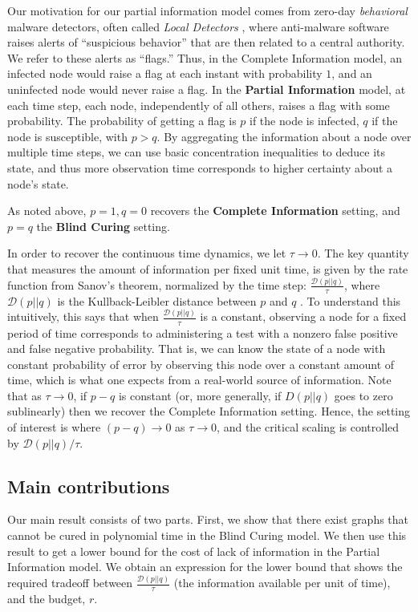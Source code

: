 Our motivation for our partial information model comes from zero-day {\em behavioral} malware detectors, often called {\em Local Detectors} \cite{bose2008,gregoire2008}, where anti-malware software raises alerts of ``suspicious behavior'' that are then related to a central authority. We refer to these alerts as ``flags.'' Thus, in the Complete Information model, an infected node would raise a flag at each instant with probability $1$, and an uninfected node would never raise a flag. In the \textbf{Partial Information} model, at each time step, each node, independently of all others, raises a flag with some probability. The probability of getting a flag is $p$ if the node is infected, $q$ if the node is susceptible, with $p>q$. By aggregating the information about a node over multiple time steps, we can use basic concentration inequalities to deduce its state, and thus more observation time corresponds to higher certainty about a node's state.

As noted above, $p=1, q=0$ recovers the \textbf{Complete Information} setting, and $p=q$ the \textbf{Blind Curing} setting. 

In order to recover the continuous time dynamics, we let $\tau \rightarrow 0$. The key quantity that measures the amount of information per fixed unit time, is given by the rate function from Sanov's theorem, normalized by the time step: $\frac{\mathcal{D}(p||q)}{\tau}$, where $\mathcal{D}(p||q)$ is the Kullback-Leibler distance between $p$ and $q$ \cite{cover2012elements}. To understand this intuitively, this says that when $\frac{\mathcal{D}(p||q)}{\tau}$ is a constant, observing a node for a fixed period of time corresponds to administering a test with a nonzero false positive and false negative probability. That is, we can know the state of a node with constant probability of error by observing this node over a constant amount of time, which is what one expects from a real-world source of information. Note that as $\tau \rightarrow 0$, if $p-q$ is constant (or, more generally, if $D(p||q)$ goes to zero sublinearly) then we recover the Complete Information setting. Hence, the setting of interest is where $(p - q) \rightarrow 0$ as $\tau \rightarrow 0$, and the critical scaling is controlled by $\mathcal{D}(p||q)/\tau$.


\subsection{Main contributions}
Our main result consists of two parts. First, we show that there exist graphs that cannot be cured in polynomial time in the Blind Curing model. We then use this result to get a lower bound for the cost of lack of information in the Partial Information model. We obtain an expression for the lower bound that shows the required tradeoff between $\frac{\mathcal{D}(p||q)}{\tau}$ (the information available per unit of time), and the budget, $r$. 


